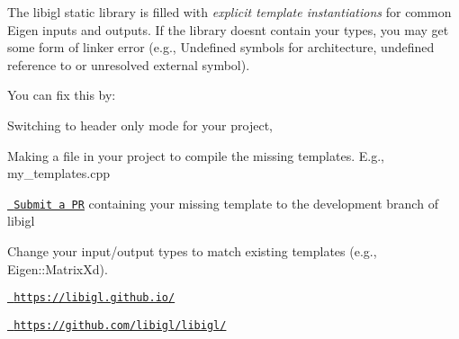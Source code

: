 The libigl static library is filled with {\itshape explicit template instantiations} for common Eigen inputs and outputs. If the library doesn\textquotesingle{}t contain your types, you may get some form of linker error (e.\+g., {\ttfamily Undefined symbols for architecture}, {\ttfamily undefined reference to} or {\ttfamily unresolved external symbol}).

You can fix this by\+:


\begin{DoxyEnumerate}
\item Switching to header only mode for your project,
\item Making a file in your project to compile the missing templates. E.\+g., {\ttfamily my\+\_\+templates.\+cpp} 
\begin{DoxyCode}{0}
\DoxyCodeLine{\textcolor{preprocessor}{\#ifdef\ IGL\_STATIC\_LIBRARY}}
\DoxyCodeLine{\textcolor{preprocessor}{\#undef\ IGL\_STATIC\_LIBRARY}}
\DoxyCodeLine{\textcolor{preprocessor}{\#endif}}

\end{DoxyCode}

\item \href{https://github.com/libigl/libigl/pulls}{\texttt{ Submit a PR}} containing your missing template to the development branch of libigl
\item Change your input/output types to match existing templates (e.\+g., {\ttfamily Eigen\+::\+Matrix\+Xd}).
\end{DoxyEnumerate}

\href{https://libigl.github.io/}{\texttt{ https\+://libigl.\+github.\+io/}}

\href{https://github.com/libigl/libigl/}{\texttt{ https\+://github.\+com/libigl/libigl/}} 